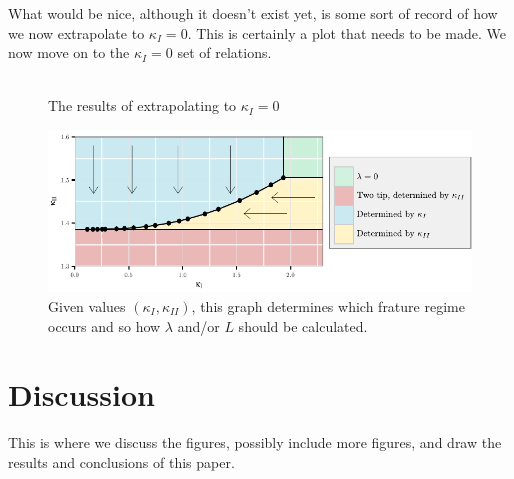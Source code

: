 \documentclass{jfm}
\begin{document}
What would be nice, although it doesn't exist yet, is some sort of record of
how we now extrapolate to $\kappa_I=0$. This is certainly a plot that needs to 
be made.
We now move on to the $\kappa_I=0$ set of relations.
\begin{figure}
 \centerline{
\includegraphics{./../../Graphs/KI-0.pdf}}
  \caption{The results of extrapolating to $\kappa_I = 0$}
\end{figure}


\begin{figure}
 \centerline{
\includegraphics{./../../Graphs/catagory-edited.pdf}}
  \caption{Given values $(\kappa_I,\kappa_{II})$, this graph determines which
           frature regime occurs and so how $\lambda$ and/or $L$ should be 
           calculated. }
\end{figure}
\section{Discussion}
This is where we discuss the figures, possibly include more figures, and draw
the results and conclusions of this paper.
\end{document}
